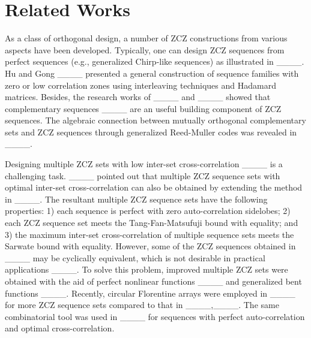 \section{Related Works}
As a class of orthogonal design, a number of ZCZ constructions from various aspects have been developed. Typically, one can design ZCZ sequences from perfect sequences (e.g., generalized Chirp-like sequences) as illustrated in ____. Hu and Gong ____ presented a general construction of sequence families with zero or low correlation zones using interleaving techniques and Hadamard matrices. Besides, the research works of ____ and ____ showed that complementary sequences ____ are an useful building component of ZCZ sequences. The algebraic connection between mutually orthogonal complementary sets and ZCZ sequences through generalized Reed-Muller codes was revealed in ____. 

Designing multiple ZCZ sets with low inter-set cross-correlation ____ is a challenging task. ____ pointed out that multiple ZCZ sequence sets with optimal inter-set cross-correlation can also be obtained by extending the method in ____. The resultant multiple ZCZ sequence sets have the following properties: 1) each sequence is perfect with zero auto-correlation sidelobes; 2) each ZCZ sequence set meets the Tang-Fan-Matsufuji bound with equality; and 3) the maximum inter-set cross-correlation of multiple sequence sets meets the Sarwate bound with equality. However, some of the ZCZ sequences obtained in ____ may be cyclically equivalent, which is not desirable in practical applications ____. To solve this problem, improved multiple ZCZ sets were obtained with the aid of perfect nonlinear functions ____ and generalized bent functions ____. Recently, circular Florentine arrays were employed in ____ for more ZCZ sequence sets compared to that in ____,____. The same combinatorial tool was used in ____ for sequences with perfect auto-correlation and optimal cross-correlation.